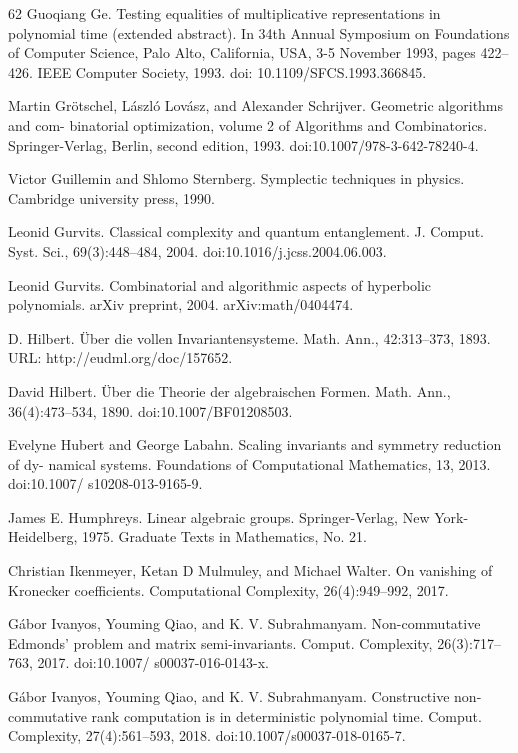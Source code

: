 \documentclass[10pt,a4paper]{article}
\theoremstyle{definition}
\numberwithin{equation}{section}
\begin{document}
\begin{thebibliography}{62}
Guoqiang Ge. Testing equalities of multiplicative representations in polynomial time (extended abstract). In 34th Annual Symposium on Foundations of Computer Science, Palo Alto, California, USA, 3-5 November 1993, pages 422–426. IEEE Computer Society, 1993. doi: 10.1109/SFCS.1993.366845.

Martin Grötschel, László Lovász, and Alexander Schrijver. Geometric algorithms and com- binatorial optimization, volume 2 of Algorithms and Combinatorics. Springer-Verlag, Berlin, second edition, 1993. doi:10.1007/978-3-642-78240-4.

Victor Guillemin and Shlomo Sternberg. Symplectic techniques in physics. Cambridge university press, 1990.

Leonid Gurvits. Classical complexity and quantum entanglement. J. Comput. Syst. Sci., 69(3):448–484, 2004. doi:10.1016/j.jcss.2004.06.003.

Leonid Gurvits. Combinatorial and algorithmic aspects of hyperbolic polynomials. arXiv preprint, 2004. arXiv:math/0404474.

D. Hilbert. Über die vollen Invariantensysteme. Math. Ann., 42:313–373, 1893. URL: http://eudml.org/doc/157652.

David Hilbert. Über die Theorie der algebraischen Formen. Math. Ann., 36(4):473–534, 1890. doi:10.1007/BF01208503.

Evelyne Hubert and George Labahn. Scaling invariants and symmetry reduction of dy- namical systems. Foundations of Computational Mathematics, 13, 2013. doi:10.1007/ s10208-013-9165-9.

James E. Humphreys. Linear algebraic groups. Springer-Verlag, New York-Heidelberg, 1975. Graduate Texts in Mathematics, No. 21.

Christian Ikenmeyer, Ketan D Mulmuley, and Michael Walter. On vanishing of Kronecker coefficients. Computational Complexity, 26(4):949–992, 2017.

Gábor Ivanyos, Youming Qiao, and K. V. Subrahmanyam. Non-commutative Edmonds’ problem and matrix semi-invariants. Comput. Complexity, 26(3):717–763, 2017. doi:10.1007/ s00037-016-0143-x.

Gábor Ivanyos, Youming Qiao, and K. V. Subrahmanyam. Constructive non-commutative rank computation is in deterministic polynomial time. Comput. Complexity, 27(4):561–593, 2018. doi:10.1007/s00037-018-0165-7.


\end{thebibliography}
\end{document}
